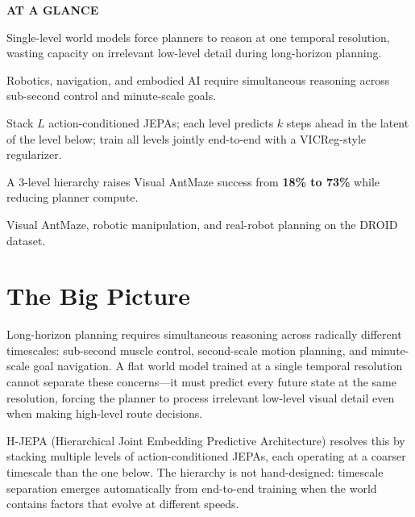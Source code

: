 \documentclass[10pt,twocolumn]{article}
\begin{document}
\begin{mdframed}[backgroundcolor=boxgray,linecolor=rulered,linewidth=1pt,
    innerleftmargin=6pt,innerrightmargin=6pt,
    innertopmargin=6pt,innerbottommargin=6pt]
\textbf{\small AT A GLANCE}\par\vspace{4pt}
\begin{description}[leftmargin=0pt,labelsep=4pt,itemsep=2pt,parsep=0pt,
    font=\small\bfseries]
  \item[Problem:] Single-level world models force planners to reason at one
    temporal resolution, wasting capacity on irrelevant low-level detail
    during long-horizon planning.
  \item[Why it matters:] Robotics, navigation, and embodied AI require
    simultaneous reasoning across sub-second control and minute-scale goals.
  \item[Method:] Stack $L$ action-conditioned JEPAs; each level predicts
    $k$ steps ahead in the latent of the level below; train all levels
    jointly end-to-end with a VICReg-style regularizer.
  \item[Result:] A 3-level hierarchy raises Visual AntMaze success from
    \textbf{18\% to 73\%} while reducing planner compute.
  \item[Evidence:] Visual AntMaze, robotic manipulation, and real-robot
    planning on the DROID dataset.
\end{description}
\end{mdframed}

\section{The Big Picture}

Long-horizon planning requires simultaneous reasoning across radically
different timescales: sub-second muscle control, second-scale motion planning,
and minute-scale goal navigation. A flat world model trained at a single
temporal resolution cannot separate these concerns---it must predict every
future state at the same resolution, forcing the planner to process
irrelevant low-level visual detail even when making high-level route decisions.

H-JEPA (Hierarchical Joint Embedding Predictive Architecture) resolves this
by stacking multiple levels of action-conditioned JEPAs, each operating at
a coarser timescale than the one below. The hierarchy is not hand-designed:
timescale separation emerges automatically from end-to-end training when the
world contains factors that evolve at different speeds.
\end{document}
